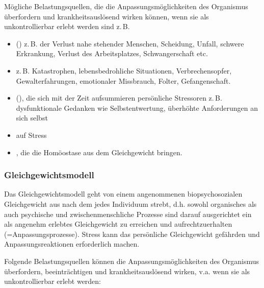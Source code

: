 Mögliche
Belastungsquellen, die die Anpassungsmöglichkeiten des
Organismus  überfordern und krankheitsauslösend wirken
können, wenn sie als unkontrollierbar erlebt werden sind
z.\,B.
\begin{itemize}
  \item {} ()
  z.\,B. der Verlust nahe stehender Menschen, Scheidung,
  Unfall, schwere Erkrankung, Verlust des Arbeitsplatzes,
  Schwangerschaft etc.
  \item {}
  z.\,B. Katastrophen, lebensbedrohliche Situationen,
  Verbrechensopfer, Gewalterfahrungen, emotionaler
  Missbrauch, Folter, Gefangenschaft.
  \item {} (), die sich mit der Zeit aufsummieren persönliche
  Stressoren z.\,B. dysfunktionale Gedanken wie
  Selbstentwertung, überhöhte Anforderungen an sich selbst
  \item {} auf Stress
  \item {}, die die Homöostase
  aus dem Gleichgewicht bringen.
\end{itemize}



\subsubsection{Gleichgewichtsmodell}

Das Gleichgewichtsmodell geht von einem angenommenen biopsychosozialen Gleichgewicht aus nach dem jedes Individuum strebt, d.h. sowohl organisches als auch psychische und zwischenmenschliche Prozesse sind darauf ausgerichtet ein als angenehm erlebtes Gleichgewicht zu erreichen und aufrechtzuerhalten (=Anpassungsprozesse). Stress kann das persönliche Gleichgewicht gefährden und Anpassungsreaktionen erforderlich machen.

Folgende Belastungsquellen können die Anpassungsmöglichkeiten des
Organismus  überfordern, beeinträchtigen und krankheitsauslösend wirken, v.a. wenn sie als unkontrollierbar erlebt werden:

